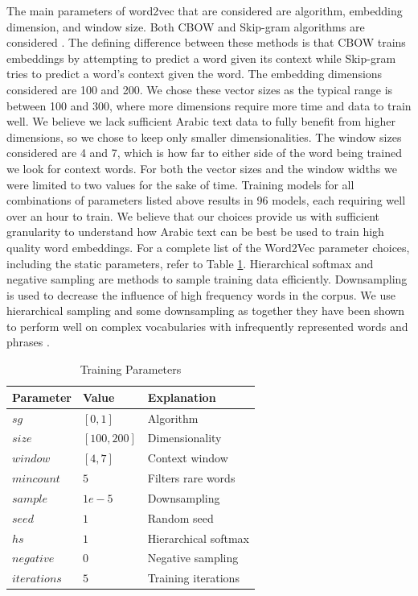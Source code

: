 The main parameters of word2vec that are considered are algorithm, embedding dimension, and window size. Both CBOW and Skip-gram algorithms are considered \cite{mikoloveffic:2013}. The defining difference between these methods is that CBOW trains embeddings by attempting to predict a word given its context while Skip-gram tries to predict a word's context given the word. The embedding dimensions considered are 100 and 200. We chose these vector sizes as the typical range is between 100 and 300, where more dimensions require more time and data to train well. We believe we lack sufficient Arabic text data to fully benefit from higher dimensions, so we chose to keep only smaller dimensionalities. The window sizes considered are 4 and 7, which is how far to either side of the word being trained we look for context words. For both the vector sizes and the window widths we were limited to two values for the sake of time. Training models for all combinations of parameters listed above results in 96 models, each requiring well over an hour to train. We believe that our choices provide us with sufficient granularity to understand how Arabic text can be best be used to train high quality word embeddings. For a complete list of the Word2Vec parameter choices, including the static parameters, refer to Table \ref{table:params}. Hierarchical softmax and negative sampling are methods to sample training data efficiently. Downsampling is used to decrease the influence of high frequency words in the corpus. We use hierarchical sampling and some downsampling as together they have been shown to perform well on complex vocabularies with infrequently represented words and phrases \cite{mikolovdist:2013}.

\begin{table}
\begin{center}
\begin{tabular}{l|l|l}
\textbf{Parameter} & \textbf{Value} & \textbf{Explanation} \\
\hline
$sg$ & $[0,1]$ & Algorithm \\
$size$ & $[100, 200]$ & Dimensionality \\
$window$ & $[4, 7]$ & Context window \\
$min count$ & $5$ & Filters rare words \\
$sample$ & $1e-5$ & Downsampling \\
$seed$ & $1$ & Random seed \\
$hs$ & $1$ & Hierarchical softmax \\
$negative$ & $0$ & Negative sampling \\
$iterations$ & $5$ & Training iterations \\
\end{tabular}
\caption{Training Parameters}
\label{table:params}
\end{center}
\end{table}
